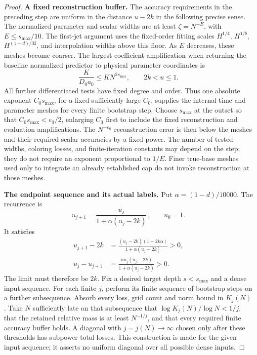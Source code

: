 \begin{proof}
\par\smallskip\noindent\textbf{A fixed reconstruction buffer.}\quad
The accuracy requirements in the preceding step are uniform in the
distance \(u-2k\) in the following precise sense.  The normalized
parameter and scalar widths are at least \(\zeta=N^{-E}\), with
\(E\le s_{\max}/10\).  The first-jet argument uses the fixed-order
fitting scales \(H^{1/4}\), \(H^{1/8}\),
\(H^{(1-d)/32}\), and interpolation widths above this floor.
As \(E\) decreases, these meshes become coarser.  The largest
coefficient amplification when returning the baseline normalized
predictor to physical parameter coordinates is
\[
 \frac{K}{D_0a_0}\le K N^{2s_{\max}},
 \qquad 2k<u\le1.
\]
All further differentiated tests have fixed degree and order.  Thus
one absolute exponent \(C_0s_{\max}\), for a fixed sufficiently
large \(C_0\), supplies the internal time and parameter meshes for
every finite bootstrap step.  Choose \(s_{\max}\) at the outset so
that \(C_0s_{\max}<e_0/2\), enlarging \(C_0\) first to include
the fixed reconstruction and evaluation amplifications.  The
\(N^{-e_0}\) reconstruction error is then below the meshes and
their required scalar accuracies by a fixed power.  The number of
tested widths, coloring losses, and finite-iteration constants may
depend on the step; they do not require an exponent proportional
to \(1/E\).  Finer true-base meshes used only to integrate an
already established cap do not invoke reconstruction at those
meshes.

\par\smallskip\noindent\textbf{The endpoint sequence and its actual labels.}\quad
Put \(\alpha=(1-d)/10000\).  The recurrence is
\[
 u_{j+1}=\frac{u_j}{1+\alpha(u_j-2k)},\qquad u_0=1.
\]
It satisfies
\begin{align*}
 u_{j+1}-2k
 &=\frac{(u_j-2k)(1-2k\alpha)}{1+\alpha(u_j-2k)}>0,\\
 u_j-u_{j+1}
 &=\frac{\alpha u_j(u_j-2k)}{1+\alpha(u_j-2k)}>0.
\end{align*}
The limit must therefore be \(2k\).  Fix a desired target depth
\(s<s_{\max}\) and a dense input sequence.  For each finite \(j\),
perform its finite sequence of bootstrap steps on a further
subsequence.  Absorb every loss, grid count and norm bound in
\(K_j(N)\).  Take \(N\) sufficiently late on that subsequence that
\(\log K_j(N)/\log N<1/j\), that the retained relative mass is
at least \(N^{-1/j}\), and that every required finite accuracy
buffer holds.  A diagonal with \(j=j(N)\to\infty\) chosen only
after these thresholds has subpower total losses.  This construction
is made for the given input sequence; it asserts no uniform diagonal
over all possible dense inputs.


\end{proof}
